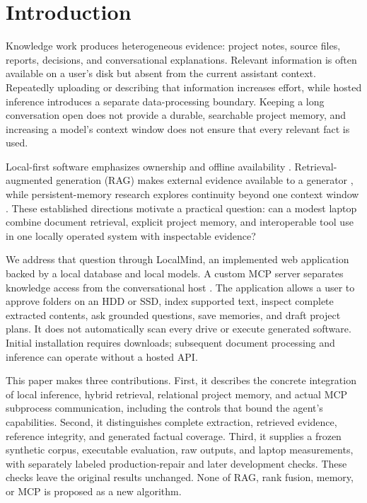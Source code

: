 \documentclass[conference,letterpaper]{IEEEtran}
\newcommand{\method}{LocalMind}
\begin{document}
\section{Introduction}
Knowledge work produces heterogeneous evidence: project notes, source files, reports, decisions, and conversational explanations. Relevant information is often available on a user's disk but absent from the current assistant context. Repeatedly uploading or describing that information increases effort, while hosted inference introduces a separate data-processing boundary. Keeping a long conversation open does not provide a durable, searchable project memory, and increasing a model's context window does not ensure that every relevant fact is used.

Local-first software emphasizes ownership and offline availability \cite{localfirst}. Retrieval-augmented generation (RAG) makes external evidence available to a generator \cite{rag}, while persistent-memory research explores continuity beyond one context window \cite{memgpt,memorybank}. These established directions motivate a practical question: can a modest laptop combine document retrieval, explicit project memory, and interoperable tool use in one locally operated system with inspectable evidence?

We address that question through \method, an implemented web application backed by a local database and local models. A custom MCP server separates knowledge access from the conversational host \cite{mcp}. The application allows a user to approve folders on an HDD or SSD, index supported text, inspect complete extracted contents, ask grounded questions, save memories, and draft project plans. It does not automatically scan every drive or execute generated software. Initial installation requires downloads; subsequent document processing and inference can operate without a hosted API.

This paper makes three contributions. First, it describes the concrete integration of local inference, hybrid retrieval, relational project memory, and actual MCP subprocess communication, including the controls that bound the agent's capabilities. Second, it distinguishes complete extraction, retrieved evidence, reference integrity, and generated factual coverage. Third, it supplies a frozen synthetic corpus, executable evaluation, raw outputs, and laptop measurements, with separately labeled production-repair and later development checks. These checks leave the original results unchanged. None of RAG, rank fusion, memory, or MCP is proposed as a new algorithm.
\end{document}
